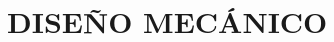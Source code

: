 \documentclass[../General.tex]{subfiles}
\begin{document}
\onehalfspacing
{}


\chapter{DISEÑO MECÁNICO}




%
\end{document}

